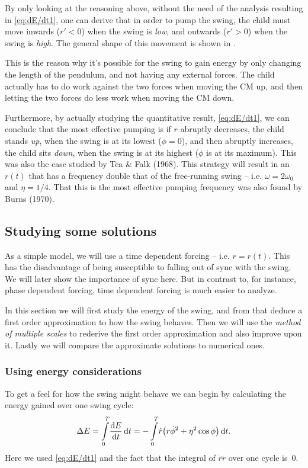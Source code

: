 By only looking at the reasoning above, without the need of the
analysis resulting in \eqref{eq:dE/dt1}, one can derive that in
order to pump the swing, the child must move inwards ($r'<0$) when the
swing is \emph{low}, and outwards ($r'>0$) when the swing is 
\emph{high}. The general shape of this movement is shown in
. 

This is the reason why it's possible for the swing to gain energy by
only changing the length of the pendulum, and not having any external
forces. The child actually has to do work against the two forces when
moving the CM up, and then letting  the two forces do less work
when moving the CM down.

Furthermore, by actually studying the quantitative result,
\eqref{eq:dE/dt1}, we can conclude that the most effective pumping
is if $r$ abruptly decreases, the child stands \emph{up}, when
the swing is at its lowest ($\phi=0$), and then abruptly increases,
the child sits \emph{down}, when the swing is at its highest ($\phi$
is at its maximum). This was also the case studied by Tea \&
Falk (1968). %
This strategy will result in an $r(t)$ that has a frequency 
double that of the free-running swing -- i.e. $\omega=2\omega_0$ and
$\eta=1/4$. That this is the most effective pumping frequency was also
found by Burns (1970). %




\subsection{Studying some solutions}
As a simple model, we will use a time dependent forcing --
i.e. $r=r(t)$. This has the disadvantage of being susceptible to
falling out of sync with the swing. We will later show the importance
of sync here. But in contrast to, for instance, phase dependent forcing,
time dependent forcing is much easier to analyze. 

In this section we will first study the energy of the swing, and from
that deduce a first order approximation to how the swing behaves. Then
we will use the \emph{method of multiple scales} to rederive the first
order approximation and also improve upon it. Lastly we will compare
the approximate solutions to numerical ones. 



\subsubsection{Using energy considerations}
\newcommand{\DE}{\Delta{E}}
To get a feel for how the swing might behave we can begin by
calculating the energy gained over one swing cycle:
\begin{equation}\label{eq:DE1}
\DE=\int_0^T\!\dv{E}{t}\id{t}
=-\int_0^T\! \dot{r}\qty(r\dot{\phi}^2 + \eta^2\cos\phi)\id{t}.
\end{equation}
Here we used \eqref{eq:dE/dt1} and the fact that the integral of
$\dot{r}\ddot{r}$ over one cycle is~$0$. 

